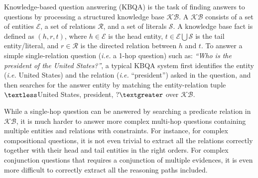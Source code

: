 Knowledge-based question answering (KBQA) is the task of finding answers to questions by processing a structured knowledge base $\mathcal{KB}$. %
A $\mathcal{KB}$ consists of a set of entities $\mathcal{E}$, a set of relations $\mathcal{R}$, and a set of literals $\mathcal{S}$. A knowledge base fact is defined as $(h,r,t)$, where $h\in \mathcal{E}$ is the head entity, $t \in \mathcal{E} \bigcup \mathcal{S}$ is the tail entity/literal, and $r\in \mathcal{R}$ is the directed relation between $h$ and $t$. To answer a simple single-relation question (\emph{i.e.} a 1-hop question) such as: \textit{``Who is the president of the United States?''}, %
a typical KBQA system first identifies the entity (\emph{i.e.} United States) and the relation (\emph{i.e.} ``president'') asked in the question, and then searches for the answer entity by matching the entity-relation tuple $\textless$United States, president, $?\textgreater$ over $\mathcal{KB}$.


While a single-hop question can be answered by searching a predicate relation in $\mathcal{KB}$, it is much harder to answer more complex multi-hop questions containing multiple entities and relations with constraints. For instance, for complex compositional questions, it is not even trivial to extract all the relations correctly together with their head and tail entities in the right orders. For complex conjunction questions that requires a conjunction of multiple evidences, it is even more difficult to correctly extract all the reasoning paths included.

